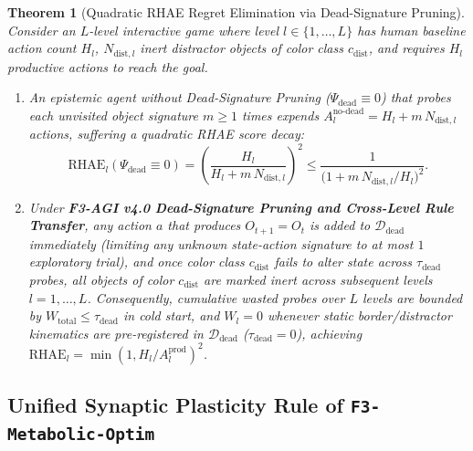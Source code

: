 \documentclass[10pt,a4paper]{article}
\newtheorem{theorem}{Theorem}
\begin{document}
\begin{theorem}[Quadratic RHAE Regret Elimination via Dead-Signature Pruning]
\label{thm:rhae}
Consider an $L$-level interactive game where level $l \in \{1,\dots,L\}$ has human baseline action count $H_l$, $N_{\text{dist},l}$ inert distractor objects of color class $c_{\text{dist}}$, and requires $H_l$ productive actions to reach the goal.
\begin{enumerate}
    \item[(a)] An epistemic agent without Dead-Signature Pruning ($\Psi_{\text{dead}} \equiv 0$) that probes each unvisited object signature $m \ge 1$ times expends $A_l^{\text{no-dead}} = H_l + m\,N_{\text{dist},l}$ actions, suffering a quadratic RHAE score decay:
    \begin{equation}
    \text{RHAE}_l(\Psi_{\text{dead}} \equiv 0) = \left(\frac{H_l}{H_l + m\,N_{\text{dist},l}}\right)^2 \le \frac{1}{\big(1 + m\,N_{\text{dist},l}/H_l\big)^2}.
    \end{equation}
    \item[(b)] Under \textbf{F3-AGI v4.0 Dead-Signature Pruning and Cross-Level Rule Transfer}, any action $a$ that produces $O_{t+1} = O_t$ is added to $\mathcal{D}_{\text{dead}}$ immediately (limiting any unknown state-action signature to at most $1$ exploratory trial), and once color class $c_{\text{dist}}$ fails to alter state across $\tau_{\text{dead}}$ probes, all objects of color $c_{\text{dist}}$ are marked inert across subsequent levels $l=1,\dots,L$. Consequently, cumulative wasted probes over $L$ levels are bounded by $W_{\text{total}} \le \tau_{\text{dead}}$ in cold start, and $W_l = 0$ whenever static border/distractor kinematics are pre-registered in $\mathcal{D}_{\text{dead}}$ ($\tau_{\text{dead}}=0$), achieving $\text{RHAE}_l = \min(1, H_l/A_l^{\text{prod}})^2$.
\end{enumerate}
\end{theorem}

\subsection{Unified Synaptic Plasticity Rule of \texttt{F3-Metabolic-Optim}}
\label{sec:math_metabolic}
\end{document}
